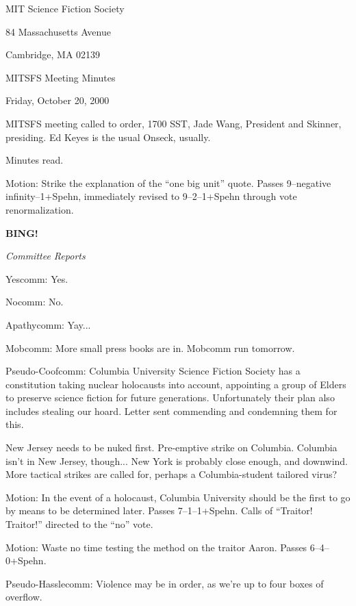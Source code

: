 \documentclass[12pt]{article}
\newcommand{\bing}{{\bf BING!} }
\newcommand{\goto}[1]{\bing \vskip 12pt \centerline{{\em{#1}}}}
\begin{document}
\begin{center}

MIT Science Fiction Society 

84 Massachusetts Avenue

Cambridge, MA 02139

\vspace{12pt}

MITSFS Meeting Minutes 

Friday, October 20, 2000

\end{center}
 
\vspace{18pt}

\setlength{\parskip}{6pt}

\noindent
MITSFS meeting called to order, 1700 SST, Jade Wang, President and
Skinner, presiding.  Ed Keyes is the usual Onseck, usually.

Minutes read.

Motion: Strike the explanation of the ``one big unit'' quote.
Passes 9--negative infinity--1+Spehn, immediately revised to
9--2--1+Spehn through vote renormalization.

\goto{Committee Reports}

Yescomm: Yes.

Nocomm: No.

Apathycomm: Yay...

Mobcomm: More small press books are in.  Mobcomm run tomorrow.

Pseudo-Coofcomm: Columbia University Science Fiction Society has
a constitution taking nuclear holocausts into account, appointing a
group of Elders to preserve science fiction for future generations.
Unfortunately their plan also includes stealing our hoard.  Letter
sent commending and condemning them for this.

New Jersey needs to be nuked first.  Pre-emptive strike on Columbia.
Columbia isn't in New Jersey, though... New York is probably close
enough, and downwind.  More tactical strikes are called for, perhaps
a Columbia-student tailored virus?

Motion: In the event of a holocaust, Columbia University should be
the first to go by means to be determined later.  Passes 7--1--1+Spehn.
Calls of ``Traitor!  Traitor!'' directed to the ``no'' vote.

Motion: Waste no time testing the method on the traitor Aaron.  Passes
6--4--0+Spehn. 

Pseudo-Hasslecomm: Violence may be in order, as we're up to four boxes
of overflow.
\end{document}
